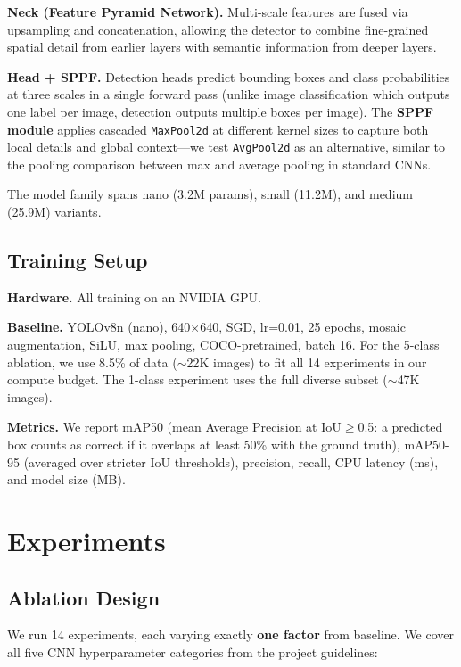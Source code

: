 \documentclass{article}
\begin{document}
\textbf{Neck (Feature Pyramid Network).} Multi-scale features are fused via upsampling and concatenation, allowing the detector to combine fine-grained spatial detail from earlier layers with semantic information from deeper layers.

\textbf{Head + SPPF.} Detection heads predict bounding boxes and class probabilities at three scales in a single forward pass (unlike image classification which outputs one label per image, detection outputs multiple boxes per image). The \textbf{SPPF module} applies cascaded \texttt{MaxPool2d} at different kernel sizes to capture both local details and global context---we test \texttt{AvgPool2d} as an alternative, similar to the pooling comparison between max and average pooling in standard CNNs.

The model family spans nano (3.2M params), small (11.2M), and medium (25.9M) variants.

\subsection{Training Setup}

\textbf{Hardware.} All training on an NVIDIA GPU.

\textbf{Baseline.} YOLOv8n (nano), 640$\times$640, SGD, lr=0.01, 25 epochs, mosaic augmentation, SiLU, max pooling, COCO-pretrained, batch 16. For the 5-class ablation, we use 8.5\% of data ($\sim$22K images) to fit all 14 experiments in our compute budget. The 1-class experiment uses the full diverse subset ($\sim$47K images).

\textbf{Metrics.} We report mAP50 (mean Average Precision at IoU$\geq$0.5: a predicted box counts as correct if it overlaps at least 50\% with the ground truth), mAP50-95 (averaged over stricter IoU thresholds), precision, recall, CPU latency (ms), and model size (MB).

\section{Experiments}
\label{sec:experiments}

\subsection{Ablation Design}

We run 14 experiments, each varying exactly \textbf{one factor} from baseline. We cover all five CNN hyperparameter categories from the project guidelines:
\end{document}
